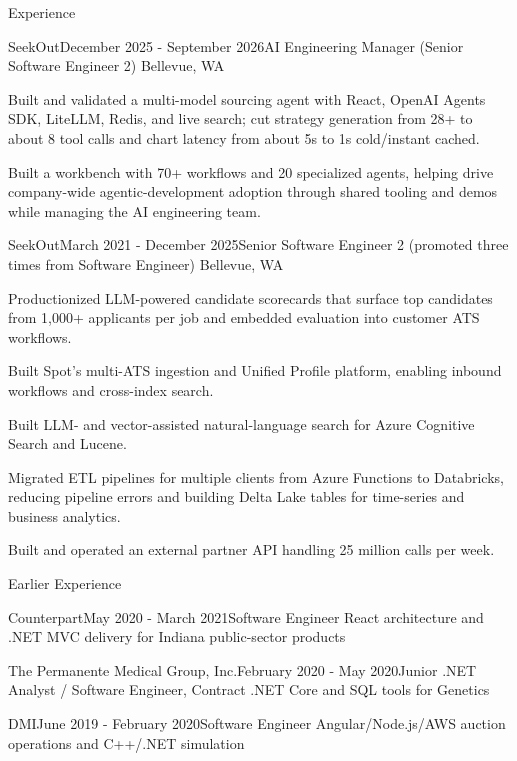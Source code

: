 \documentclass{resume} %
\begin{document}
\begin{rSection}{Experience}
\begin{rSubsection}{SeekOut}{December 2025 - September 2026}{AI Engineering Manager (Senior Software Engineer 2) \textbar{} Bellevue, WA}
        \item Built and validated a multi-model sourcing agent with React, OpenAI Agents SDK, LiteLLM, Redis, and live search; cut strategy generation from 28+ to about 8 tool calls and chart latency from about 5s to 1s cold/instant cached.
        \item Built a workbench with 70+ workflows and 20 specialized agents, helping drive company-wide agentic-development adoption through shared tooling and demos while managing the AI engineering team.
    \end{rSubsection}
    \begin{rSubsection}{SeekOut}{March 2021 - December 2025}{Senior Software Engineer 2 (promoted three times from Software Engineer) \textbar{} Bellevue, WA}
        \item Productionized LLM-powered candidate scorecards that surface top candidates from 1,000+ applicants per job and embedded evaluation into customer ATS workflows.
        \item Built Spot's multi-ATS ingestion and Unified Profile platform, enabling inbound workflows and cross-index search.
        \item Built LLM- and vector-assisted natural-language search for Azure Cognitive Search and Lucene.
        \item Migrated ETL pipelines for multiple clients from Azure Functions to Databricks, reducing pipeline errors and building Delta Lake tables for time-series and business analytics.
        \item Built and operated an external partner API handling 25 million calls per week.
    \end{rSubsection}
\end{rSection}

\begin{rSection}{Earlier Experience}
    \begin{rsemisection}{Counterpart}{May 2020 - March 2021}{Software Engineer \textbar{} React architecture and .NET MVC delivery for Indiana public-sector products}
    \end{rsemisection}

    \begin{rsemisection}{The Permanente Medical Group, Inc.}{February 2020 - May 2020}{Junior .NET Analyst / Software Engineer, Contract \textbar{} .NET Core and SQL tools for Genetics}
    \end{rsemisection}

    \begin{rsemisection}{DMI}{June 2019 - February 2020}{Software Engineer \textbar{} Angular/Node.js/AWS auction operations and C++/.NET simulation}
    \end{rsemisection}
\end{rSection}
\end{document}
